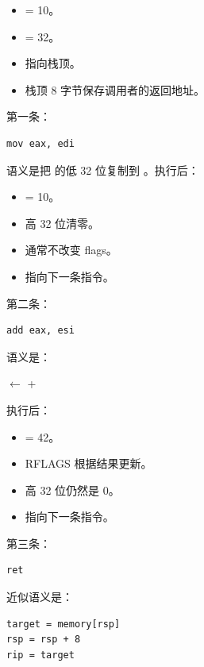 \begin{itemize}
  \item {} = 10。
  \item {} = 32。
  \item {} 指向栈顶。
  \item 栈顶 8 字节保存调用者的返回地址。
\end{itemize}

第一条：

\begin{lstlisting}
mov eax, edi
\end{lstlisting}

语义是把  的低 32 位复制到 。执行后：

\begin{itemize}
  \item {} = 10。
  \item {} 高 32 位清零。
  \item 通常不改变 flags。
  \item {} 指向下一条指令。
\end{itemize}

第二条：

\begin{lstlisting}
add eax, esi
\end{lstlisting}

语义是：

\begin{center}
 $\leftarrow$  + 
\end{center}

执行后：

\begin{itemize}
  \item {} = 42。
  \item RFLAGS 根据结果更新。
  \item {} 高 32 位仍然是 0。
  \item {} 指向下一条指令。
\end{itemize}

第三条：

\begin{lstlisting}
ret
\end{lstlisting}

近似语义是：

\begin{center}
\begin{minipage}{0.72\linewidth}
\begin{verbatim}
target = memory[rsp]
rsp = rsp + 8
rip = target
\end{verbatim}
\end{minipage}
\end{center}

